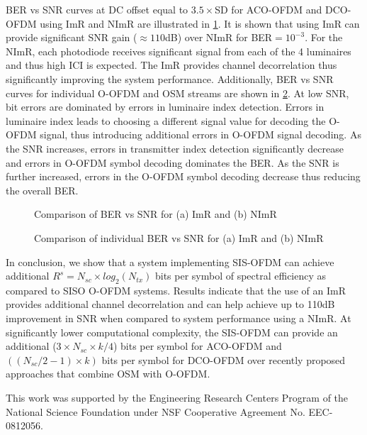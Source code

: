 \documentclass[12pt,letterpaper,onecolumn]{article} %
\begin{document}
BER vs SNR curves at DC offset equal to $3.5 \times$SD for ACO-OFDM and DCO-OFDM using ImR and NImR are illustrated in \figurename{\ref{fig:BERnet}}. It is shown that using ImR can provide significant SNR gain ($\approx 110$dB) over NImR for BER$=10^{-3}$. For the NImR, each photodiode receives significant signal from each of the 4 luminaires and thus high ICI is expected. The ImR provides channel decorrelation thus significantly improving the system performance. Additionally, BER vs SNR curves for individual O-OFDM and OSM streams are shown in \figurename{\ref{fig:BERsplit}}. At low SNR, bit errors are dominated by errors in luminaire index detection. Errors in luminaire index leads to choosing a different signal value for decoding the O-OFDM signal, thus introducing additional errors in O-OFDM signal decoding. As the SNR increases, errors in transmitter index detection significantly decrease and errors in O-OFDM symbol decoding dominates the BER. As the SNR is further increased, errors in the O-OFDM symbol decoding decrease thus reducing the overall BER.
\begin{figure}[!t]
\makebox[\textwidth]{\framebox[3.3in]{\rule{0pt}{2.48in}}}
\caption{Comparison of BER vs SNR for (a) ImR and (b) NImR}
	\label{fig:BERnet}
\end{figure}
\begin{figure}[!t]
\makebox[\textwidth]{\framebox[3.3in]{\rule{0pt}{2.48in}}}
\caption{Comparison of individual BER vs SNR for (a) ImR and (b) NImR}
	\label{fig:BERsplit}
\end{figure}

In conclusion, we show that a system implementing SIS-OFDM can achieve additional $R^s=N_{sc}\times log_2(N_{tx})$ bits per symbol of spectral efficiency as compared to SISO O-OFDM systems. Results indicate that  the use of an ImR provides additional channel decorrelation and can help achieve up to 110dB improvement in SNR when compared to system performance using a NImR. At significantly lower computational complexity, the SIS-OFDM can provide an additional ($3\times N_{sc}\times k/4$) bits per symbol for ACO-OFDM and $((N_{sc}/2 -1)\times k)$ bits per symbol for DCO-OFDM over recently proposed approaches that combine OSM with O-OFDM.

This work was supported by the Engineering Research Centers Program of the National Science Foundation under NSF Cooperative Agreement No. EEC-0812056.


\end{document}
